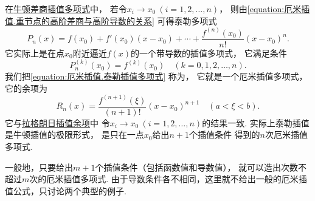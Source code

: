 在\hyperref[equation:牛顿插值.牛顿差商插值多项式]{牛顿差商插值多项式}中，
若令\(x_i \to x_0\ (i=1,2,\dotsc,n)\)，
则由\cref{equation:厄米插值.重节点的高阶差商与高阶导数的关系}
可得泰勒多项式\begin{equation}\label{equation:厄米插值.泰勒插值多项式}
	P_n(x)
	= f(x_0)
	+ f'(x_0) (x-x_0)
	+ \dotsb
	+ \frac{f^{(n)}(x_0)}{n!} (x-x_0)^n.
\end{equation}
它实际上是在点\(x_0\)附近逼近\(f(x)\)的一个带导数的插值多项式，
它满足条件\begin{equation}\label{equation:厄米插值.泰勒插值多项式的高阶导数}
	P_n^{(k)}(x_0)
	= f^{(k)}(x_0)
	\quad(k=0,1,2,\dotsc,n).
\end{equation}
我们把\cref{equation:厄米插值.泰勒插值多项式} 称为，
它就是一个厄米插值多项式，
它的余项为\begin{equation*}
	R_n(x)
	= \frac{f^{(n+1)}(\xi)}{(n+1)!} (x-x_0)^{n+1}
	\quad(a < \xi < b).
\end{equation*}
它与\hyperref[equation:拉格朗日插值.拉格朗日插值余项]{拉格朗日插值余项}中
令\(x_i \to x_0\ (i=1,2,\dotsc,n)\)的结果一致.
实际上泰勒插值是牛顿插值的极限形式，
是只在一点\(x_0\)给出\(n+1\)个插值条件 
得到的\(n\)次厄米插值多项式.

一般地，只要给出\(m+1\)个插值条件（包括函数值和导数值），
就可以造出次数不超过\(m\)次的厄米插值多项式.
由于导数条件各不相同，这里就不给出一般的厄米插值公式，只讨论两个典型的例子.
